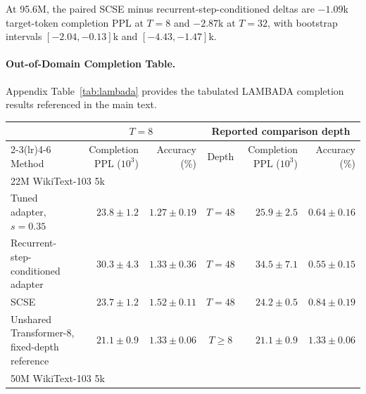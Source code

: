 \documentclass[letterpaper]{article} %
\newcommand{\SCSE}{\textsc{SCSE}}
\theoremstyle{remark}
\begin{document}
At 95.6M, the paired \SCSE{} minus recurrent-step-conditioned deltas are $-1.09$k target-token completion PPL at $T=8$ and $-2.87$k at $T=32$, with bootstrap intervals $[-2.04,-0.13]$k and $[-4.43,-1.47]$k.

\paragraph{Out-of-Domain Completion Table.} Appendix Table~\ref{tab:lambada} provides the tabulated LAMBADA completion results referenced in the main text.

\begin{table}[t!]
	\centering
	\scriptsize
	\begin{tabular}{lrrcrr}
		\toprule
		                                              & \multicolumn{2}{c}{$T=8$} & \multicolumn{3}{c}{Reported comparison depth}                                                              \\
		\cmidrule(lr){2-3}\cmidrule(lr){4-6}
		Method                                        & Completion PPL ($10^3$)   & Accuracy (\%)                                 & Depth   & Completion PPL ($10^3$) & Accuracy (\%)          \\
		\midrule
		\multicolumn{6}{l}{22M WikiText-103 5k}                                                                                                                                                \\
		Tuned adapter, $s=0.35$                       & $23.8\pm1.2$              & $1.27\pm0.19$                                 & $T=48$  & $25.9\pm2.5$            & $0.64\pm0.16$          \\
		Recurrent-step-conditioned adapter            & $30.3\pm4.3$              & $1.33\pm0.36$                                 & $T=48$  & $34.5\pm7.1$            & $0.55\pm0.15$          \\
		\SCSE{}                                       & $\mathbf{23.7\pm1.2}$     & $\mathbf{1.52\pm0.11}$                        & $T=48$  & $\mathbf{24.2\pm0.5}$   & $\mathbf{0.84\pm0.19}$ \\
		\addlinespace[2pt]
		Unshared Transformer-8, fixed-depth reference & $21.1\pm0.9$              & $1.33\pm0.06$                                 & $T\ge8$ & $21.1\pm0.9$            & $1.33\pm0.06$          \\
		\midrule
		\multicolumn{6}{l}{50M WikiText-103 5k}                                                                                                                                                \\

\end{tabular}
\end{table}
\end{document}
